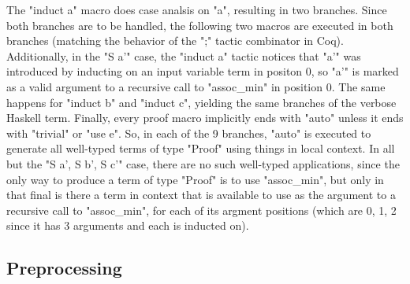  The "induct a" macro does case analsis on "a", resulting in two branches. Since both branches are to be handled, the following two macros are executed in both branches (matching the behavior of the ";" tactic combinator in Coq).
 Additionally, in the "S a'" case, the "induct a" tactic notices that "a'" was introduced by inducting on an input variable term in positon 0, so "a'" is marked as a valid argument to a recursive call to "assoc\_min" in position 0.
 The same happens for "induct b" and "induct c", yielding the same branches of the verbose Haskell term.
 Finally, every proof macro implicitly ends with "auto" unless it ends with "trivial" or "use e".
 So, in each of the 9 branches, "auto" is executed to generate all well-typed terms of type "Proof" using things in local context.
 In all but the "S a', S b', S c'" case, there are no such well-typed applications, since the only way to produce a term of type "Proof" is to use "assoc\_min", but only in that final is there a term in context that is available to use as the argument to a recursive call to "assoc\_min", for each of its argment positions (which are 0, 1, 2 since it has 3 arguments and each is inducted on).
  
\subsection{Preprocessing}
  
